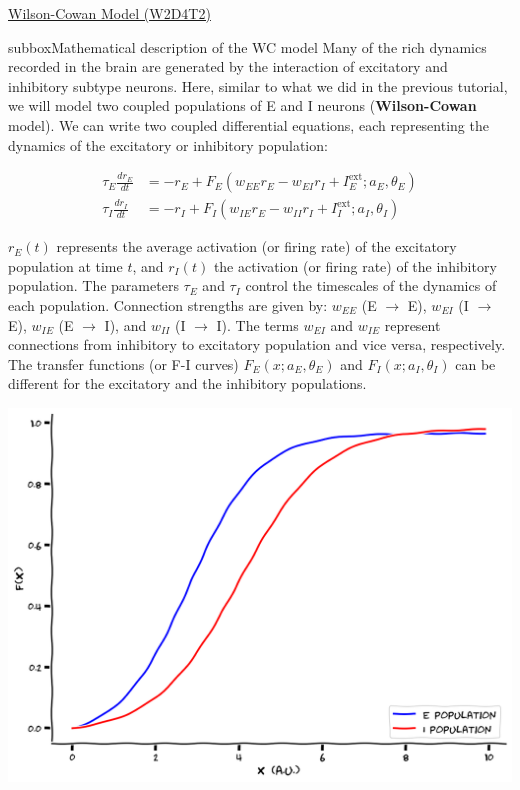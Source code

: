 \begin{textbox}{\href{https://compneuro.neuromatch.io/tutorials/W2D4_DynamicNetworks/chapter_title.html}{Wilson-Cowan Model (W2D4T2)} }
\begin{subbox}{subbox}{Mathematical description of the WC model}
\scriptsize
Many of the rich dynamics recorded in the brain are generated by the interaction of excitatory and inhibitory subtype neurons. Here, similar to what we did in the previous tutorial, we will model two coupled populations of E and I neurons (\textbf{Wilson-Cowan} model). We can write two coupled differential equations, each representing the dynamics of the excitatory or inhibitory population:

\begin{align*}
\tau_E \frac{dr_E}{dt} &= -r_E + F_E(w_{EE}r_E -w_{EI}r_I + I^{\text{ext}}_E;a_E,\theta_E)\\
\tau_I \frac{dr_I}{dt} &= -r_I + F_I(w_{IE}r_E -w_{II}r_I + I^{\text{ext}}_I;a_I,\theta_I)    
\end{align*}

$r_E(t)$ represents the average activation (or firing rate) of the excitatory population at time $t$, and $r_I(t)$ the activation (or firing rate) of the inhibitory population. The parameters $\tau_E$ and $\tau_I$ control the timescales of the dynamics of each population. Connection strengths are given by: $w_{EE}$ (E $\rightarrow$ E), $w_{EI}$ (I $\rightarrow$ E), $w_{IE}$ (E $\rightarrow$ I), and $w_{II}$ (I $\rightarrow$ I). The terms $w_{EI}$ and $w_{IE}$ represent connections from inhibitory to excitatory population and vice versa, respectively. The transfer functions (or F-I curves) $F_E(x;a_E,\theta_E)$ and $F_I(x;a_I,\theta_I)$ can be different for the excitatory and the inhibitory populations.
\begin{center}
\includegraphics[scale=0.18]{Figures/DN/DN_Figure5.png}
\end{center}
\end{subbox}

\end{textbox}
